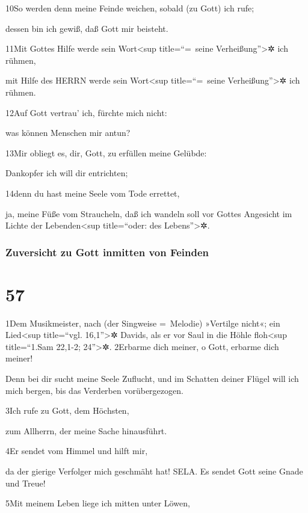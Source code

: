 10So werden denn meine Feinde weichen, sobald (zu Gott) ich rufe;

dessen bin ich gewiß, daß Gott mir beisteht.

11Mit Gottes Hilfe werde sein Wort\textless sup title=``=~seine
Verheißung''\textgreater✲ ich rühmen,

mit Hilfe des HERRN werde sein Wort\textless sup title=``=~seine
Verheißung''\textgreater✲ ich rühmen.

12Auf Gott vertrau' ich, fürchte mich nicht:

was können Menschen mir antun?

13Mir obliegt es, dir, Gott, zu erfüllen meine Gelübde:

Dankopfer ich will dir entrichten;

14denn du hast meine Seele vom Tode errettet,

ja, meine Füße vom Straucheln, daß ich wandeln soll vor Gottes Angesicht
im Lichte der Lebenden\textless sup title=``oder: des
Lebens''\textgreater✲.

\hypertarget{zuversicht-zu-gott-inmitten-von-feinden}{%
\subsubsection{Zuversicht zu Gott inmitten von
Feinden}\label{zuversicht-zu-gott-inmitten-von-feinden}}

\hypertarget{section-56}{%
\section{57}\label{section-56}}

1Dem Musikmeister, nach (der Singweise =~Melodie) »Vertilge nicht«; ein
Lied\textless sup title=``vgl. 16,1''\textgreater✲ Davids, als er vor
Saul in die Höhle floh\textless sup title=``1.Sam 22,1-2;
24''\textgreater✲. 2Erbarme dich meiner, o Gott, erbarme dich meiner!

Denn bei dir sucht meine Seele Zuflucht, und im Schatten deiner Flügel
will ich mich bergen, bis das Verderben vorübergezogen.

3Ich rufe zu Gott, dem Höchsten,

zum Allherrn, der meine Sache hinausführt.

4Er sendet vom Himmel und hilft mir,

da der gierige Verfolger mich geschmäht hat! SELA. Es sendet Gott seine
Gnade und Treue!

5Mit meinem Leben liege ich mitten unter Löwen,

